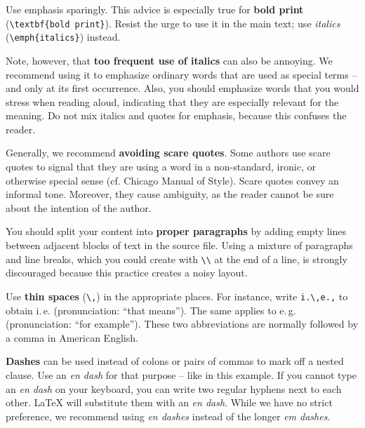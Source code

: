 Use emphasis sparingly. This advice is especially true for \textbf{bold print} (\verb|\textbf{bold print}|).%
Resist the urge to use it in the main text; use \emph{italics} (\verb|\emph{italics}|) instead.

Note, however, that \textbf{too frequent use of italics} can also be annoying.
We recommend using it to emphasize ordinary words that are used as special terms – and only at its first occurrence. Also, you should emphasize words that you would stress when reading aloud, indicating that they are especially relevant for the meaning. Do not mix italics and quotes for emphasis, because this confuses the reader.


Generally, we recommend \textbf{avoiding scare quotes}.%
Some authors use scare quotes to signal that they are using a word in a non-standard, ironic, or otherwise special sense (cf. Chicago Manual of Style). Scare quotes convey an informal tone. Moreover, they cause ambiguity, as the reader cannot be sure about the intention of the author.

You should split your content into \textbf{proper paragraphs} by adding empty lines between adjacent blocks of text in the source file. Using a mixture of paragraphs and line breaks, which you could create with \verb|\\| at the end of a line, is strongly discouraged because this practice creates a noisy layout.

Use \textbf{thin spaces} (\verb|\,|) in the appropriate places. For instance, write \verb|i.\,e.,| to obtain i.\,e. (pronunciation: ``that means''). The same applies to e.\,g. (pronunciation: ``for example''). These two abbreviations are normally followed by a comma in American English.

\textbf{Dashes} can be used instead of colons or pairs of commas to mark off a nested clause. Use an \emph{en dash} for that purpose -- like in this example. If you cannot type an \emph{en dash} on your keyboard, you can write two regular hyphens next to each other. LaTeX will substitute them with an \emph{en dash}. While we have no strict preference, we recommend using \emph{en dashes} instead of the longer \emph{em dashes}.

